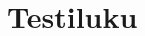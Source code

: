 \chapter{Testiluku}

\begin{kuvaajapohja}{2}{-3.14}{3.14}{-1.25}{1.25}
\end{kuvaajapohja}

\begin{kuvaajapohja}{2}{-3.14}{3.14}{-1.25}{1.25}
\end{kuvaajapohja}

\begin{lukusuora}{-1}{1}{10}
\end{lukusuora}

\begin{merkkikaavio}{5}

	\merkkikaavioMerkki{$+$}
	\merkkikaavioMerkki{$-$}
	\merkkikaavioMerkki{$-$}
	\merkkikaavioMerkki{$+$}
	\merkkikaavioMerkki{$-$}
	\merkkikaavioMerkki{$+$}
\merkkikaavioUusirivi
	\merkkikaavioMerkki{$+$}
	\merkkikaavioMerkki{$+$}
	\merkkikaavioMerkki{$-$}
	\merkkikaavioMerkki{$-$}
	\merkkikaavioMerkki{$+$}
	\merkkikaavioMerkki{$-$}
\merkkikaavioUusirivi
	\merkkikaavioMerkki{$-$}
	\merkkikaavioMerkki{$-$}
	\merkkikaavioMerkki{$-$}
	\merkkikaavioMerkki{$+$}
	\merkkikaavioMerkki{$-$}
	\merkkikaavioMerkki{$+$}
\merkkikaavioUusirivi
	\merkkikaavioMerkki{$+$}
	\merkkikaavioMerkki{$-$}
	\merkkikaavioMerkki{$+$}
	\merkkikaavioMerkki{$-$}
	\merkkikaavioMerkki{$+$}
	\merkkikaavioMerkki{$-$}
\end{merkkikaavio}
